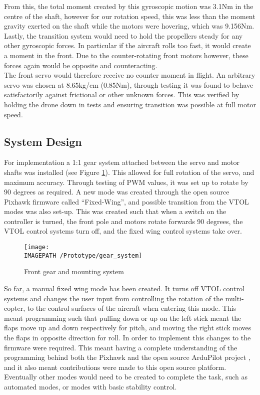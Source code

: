 From this, the total moment created by this gyroscopic motion was 3.1Nm in the centre of the shaft, however for our rotation speed, this was less than the moment gravity exerted on the shaft while the motors were hovering, which was 9.156Nm. Lastly, the transition system would need to hold the propellers steady for any other gyroscopic forces. In particular if the aircraft rolls too fast, it would create a moment in the front. Due to the counter-rotating front motors however, these forces again would be opposite and counteracting.\\

The front servo would therefore receive no counter moment in flight. An arbitrary servo was chosen at 8.65kg/cm (0.85Nm), through testing it was found to behave satisfactorily against frictional or other unknown forces. This was verified by holding the drone down in tests and ensuring transition was possible at full motor speed.

\subsection{System Design}
For implementation a 1:1 gear  system attached between the servo and motor shafts was installed (see Figure \ref{fig:gearsys}). This allowed for full rotation of the servo, and maximum accuracy.  Through testing of PWM values, it was set up to rotate by 90 degrees as required. A new mode was created through the open source Pixhawk firmware called “Fixed-Wing”, and possible transition from the VTOL modes was also set-up. This was created such that when a switch on the controller is turned, the front pole and motors rotate forwards 90 degrees, the VTOL control systems turn off, and the fixed wing control systems take over.\\

\begin{figure}[!ht]
	\centering
	\texttt{[image: \\IMAGEPATH /Prototype/gear\_system]}
	\caption{Front gear and mounting system}
	\label{fig:gearsys}
\end{figure}

So far, a manual fixed wing mode has been created. It turns off VTOL control systems and changes the user input from controlling the rotation of the multi-copter, to the control surfaces of the aircraft when entering this mode. This meant programming such that pulling down or up on the left stick meant the flaps move up and down respectively for pitch, and moving the right stick moves the flaps in opposite direction for roll.  In order to implement this changes to the firmware were required.  This meant having  a complete understanding of the programming behind both the Pixhawk  and the open source ArduPilot project , and it also meant contributions were made to this open source platform. Eventually other modes would need to be created to complete the task, such as automated modes, or modes with basic stability control.\\

